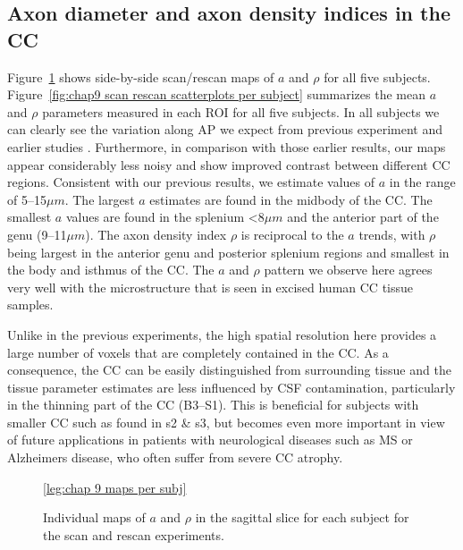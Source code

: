 \subsection*{Axon diameter and axon density indices in the CC}
Figure~\ref{fig:chap9 scan rescan maps per subject} shows side-by-side scan/rescan maps of $a$ and $\rho$ for all five subjects. Figure~\ref{fig:chap9 scan rescan scatterplots per subject} summarizes the mean $a$ and $\rho$ parameters measured in each ROI for all five subjects. In all subjects we can clearly see the variation along AP we expect from previous experiment and earlier studies \citep{Alexander:2010}. Furthermore, in comparison with those earlier results, our maps appear considerably less noisy and show improved contrast between different CC regions. Consistent with our previous results, we estimate values of $a$ in the range of 5--15$\mu m$. The largest $a$ estimates are found in the midbody of the CC. The smallest $a$ values are found in the splenium <8$\mu m$ and the anterior part of the genu (9--11$\mu m$). The axon density index $\rho$ is reciprocal to the $a$ trends, with $\rho$ being largest in the anterior genu and posterior splenium regions and smallest in the body and isthmus of the CC. The $a$ and $\rho$ pattern we observe here agrees very well with the microstructure that is seen in excised human CC tissue samples.


Unlike in the previous experiments, the high spatial resolution here provides a large number of voxels that are completely contained in the CC. As a consequence, the CC can be easily distinguished from surrounding tissue and the tissue parameter estimates are less influenced by CSF contamination, particularly in the thinning part of the CC (B3--S1). This is beneficial for subjects with smaller CC such as found in s2 \& s3, but becomes even more important in view of future applications in patients with neurological diseases such as MS or Alzheimers disease, who often suffer from severe CC atrophy. 
\begin{figure}[ht]
	\centering
 	\ref{leg:chap 9 maps per subj}
	\caption{Individual maps of $a$ and $\rho$ in the sagittal slice for each subject for the scan and rescan experiments.}
	\label{fig:chap9 scan rescan maps per subject}
\end{figure}

